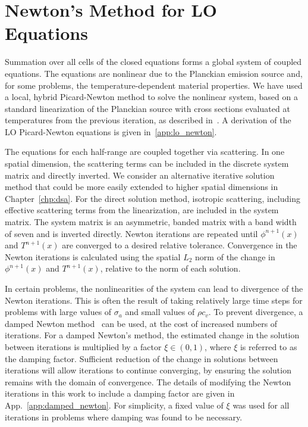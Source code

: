 \section{Newton's Method for LO Equations}
\label{sec:newton_overview}

Summation over all cells of the closed equations forms a global system of coupled equations.
The equations are nonlinear due to the Planckian emission source and, for some problems, the temperature-dependent material properties.
We have used a local, hybrid Picard-Newton method to solve the nonlinear system, based on a standard linearization of the Planckian source with cross
sections evaluated at temperatures from the previous iteration, as described
in~\cite{morel_ldtrt}.  A derivation of the LO Picard-Newton equations is given
in~\ref{app:lo_newton}.

The equations for each half-range are coupled together via scattering.  
In one spatial dimension, the scattering terms can be included in the discrete system
matrix and directly inverted.  We consider an alternative iterative solution method that
could be more easily extended to higher spatial dimensions in Chapter~\ref{chp:dsa}.
For the direct solution method, isotropic scattering,
including effective scattering terms from the linearization, are included in the system matrix. The system
matrix is an asymmetric, banded matrix with a band width of seven and is inverted
directly. 
Newton iterations are repeated until $\phi^{n+1}(x)$ and $T^{n+1}(x)$ are converged
to a desired relative tolerance.  Convergence in the Newton iterations is calculated using the spatial $L_2$
norm of the change in $\phi^{n+1}(x)$ and $T^{n+1}(x)$, relative to the norm of each
solution.  

In certain problems, the nonlinearities of the system can lead to divergence of the Newton
iterations.  This is often the result of taking relatively large time steps for problems with large
values of $\sigma_a$ and small values of $\rho c_v$.  To prevent divergence, a damped
Newton method~\cite{damped_newton} can be used, at the cost of increased numbers of iterations.  For a
damped Newton's method, the estimated change in the solution between iterations is multiplied by a factor $\xi\in(0,1)$, where $\xi$ is referred to as the damping factor.
Sufficient reduction of the change in solutions between iterations will allow iterations
to continue converging, by ensuring the solution remains with the domain of convergence.  
The details of modifying the Newton iterations in this work to include a damping factor are given in
App.~\ref{app:damped_newton}.  For simplicity, a fixed value of $\xi$ was used for all
iterations in problems where damping was found to be necessary.

